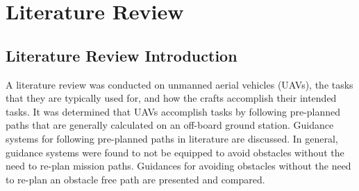 \documentclass[numbered,pdftex]{ohio-etd}
\begin{document}
 
 
\chapter{Literature Review}
\section{Literature Review Introduction}

A literature review was conducted on unmanned aerial vehicles (UAVs), the tasks that they are typically used for, and how the crafts accomplish their intended tasks. It was determined that UAVs accomplish tasks by following pre-planned paths that are generally calculated on an off-board ground station. Guidance systems for following pre-planned paths in literature are discussed. In general, guidance systems were found to not be equipped to avoid obstacles without the need to re-plan mission paths. Guidances for avoiding obstacles without the need to re-plan an obstacle free path are presented and compared.
\end{document}
